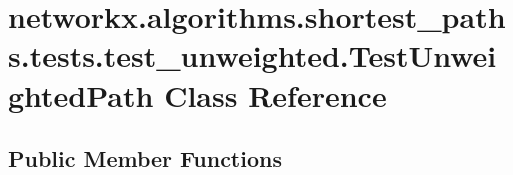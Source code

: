\hypertarget{classnetworkx_1_1algorithms_1_1shortest__paths_1_1tests_1_1test__unweighted_1_1TestUnweightedPath}{}\section{networkx.\+algorithms.\+shortest\+\_\+paths.\+tests.\+test\+\_\+unweighted.\+Test\+Unweighted\+Path Class Reference}
\label{classnetworkx_1_1algorithms_1_1shortest__paths_1_1tests_1_1test__unweighted_1_1TestUnweightedPath}
\subsection*{Public Member Functions}
